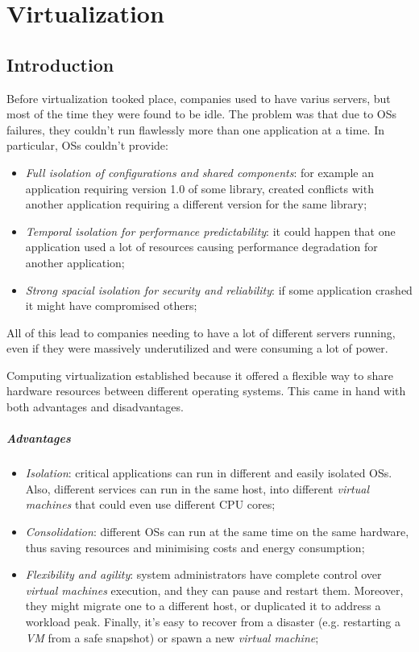 \chapter{Virtualization}
\section{Introduction}
Before virtualization tooked place, companies used to have varius servers, but
most of the time they were found to be idle. The problem was that due to OSs
failures, they couldn't run flawlessly more than one application at a time. In
particular, OSs couldn't provide:
\begin{itemize}
    \item\emph{Full isolation of configurations and shared components}: for
    example an application requiring version 1.0 of some library, created conflicts
    with another application requiring a different version for the same library;
    \item\emph{Temporal isolation for performance predictability}: it could
    happen that one application used a lot of resources causing performance
    degradation for another application;
    \item\emph{Strong spacial isolation for security and reliability}: if
    some application crashed it might have compromised others;
\end{itemize}
All of this lead to companies needing to have a lot of different servers running,
even if they were massively underutilized and were consuming a lot of power.

Computing virtualization established because it offered a flexible way to
share hardware resources between different operating systems. This came in hand
with both advantages and disadvantages.

\paragraph{Advantages}
\begin{itemize}
    \item\emph{Isolation}: critical applications can run in different and
    easily isolated OSs. Also, different services can run in the same host,
    into different \emph{virtual machines} that could even use different CPU cores;
    \item\emph{Consolidation}: different OSs can run at the same time on the
    same hardware, thus saving resources and minimising costs and energy
    consumption;
    \item\emph{Flexibility and agility}: system administrators have complete control
    over \emph{virtual machines} execution, and they can pause and restart them.
    Moreover, they might migrate one to a different host, or duplicated it to address a
    workload peak. Finally, it's easy to recover from a disaster (e.g. restarting
    a \emph{VM} from a safe snapshot) or spawn a new \emph{virtual machine};
\end{itemize}

